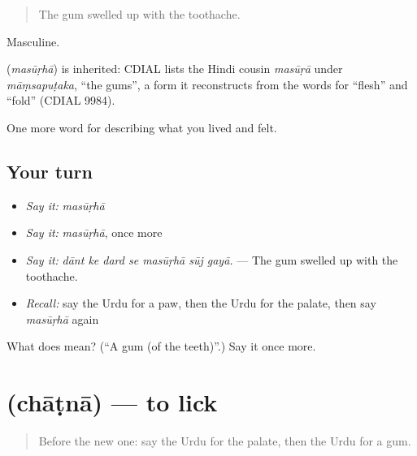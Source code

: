 \begin{quote}
The gum swelled up with the toothache.
\end{quote}

Masculine.

\begin{cousinweb}
\textbf{} (\emph{masūṛhā}) is inherited: CDIAL lists the Hindi cousin \emph{masūṛā} under \emph{māṃsapuṭaka}, \textquotedblleft{}the gums\textquotedblright{}, a form it reconstructs from the words for \textquotedblleft{}flesh\textquotedblright{} and \textquotedblleft{}fold\textquotedblright{} (CDIAL 9984).
\end{cousinweb}

\begin{grammarlens}[title={What you've built}]
One more word for describing what you lived and felt.
\end{grammarlens}

\subsection*{Your turn}
\begin{itemize}
\raggedright
  \item \emph{Say it:} \emph{masūṛhā}
  \item \emph{Say it:} \emph{masūṛhā}, once more
  \item \emph{Say it:} \emph{dānt ke dard se masūṛhā sūj gayā.} — The gum swelled up with the toothache.
  \item \emph{Recall:} say the Urdu for a paw, then the Urdu for the palate, then say \emph{masūṛhā} again
\end{itemize}

\begin{tcolorbox}[breakable,colback=teal!4,colframe=teal!35!black,title={Before you move on}]
What does  mean? (\textquotedblleft{}A gum (of the teeth)\textquotedblright{}.) Say it once more.
\end{tcolorbox}
\section[\texorpdfstring{\ur{چاٹنا} (chāṭnā)}{چاٹنا (chāṭnā)}]{ (chāṭnā) — to lick}

\label{lesson:UR-C467-chatna}



\begin{quote}
Before the new one: say the Urdu for the palate, then the Urdu for a gum.
\end{quote}

